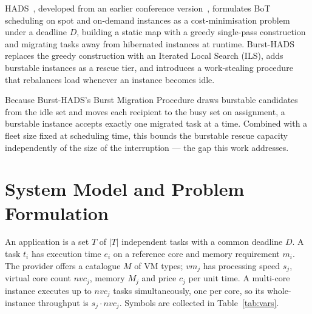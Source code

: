\documentclass[conference]{IEEEtran}
\begin{document}
HADS~\cite{hads2021}, developed from an earlier conference version~\cite{hadsconf},
formulates BoT scheduling on spot and on-demand instances
as a cost-minimisation problem under a deadline $D$, building a static map with
a greedy single-pass construction and migrating tasks away from hibernated
instances at runtime. Burst-HADS~\cite{bursthads} replaces the greedy
construction with an Iterated Local Search (ILS), adds burstable instances as a
rescue tier, and introduces a work-stealing procedure that rebalances load
whenever an instance becomes idle.

Because Burst-HADS's Burst Migration Procedure draws burstable candidates from
the idle set and moves each recipient to the busy set on assignment, a burstable
instance accepts exactly one migrated task at a time. Combined with a fleet size
fixed at scheduling time, this bounds the burstable rescue capacity independently
of the size of the interruption --- the gap this work addresses.

\section{System Model and Problem Formulation}

An application is a set $T$ of $|T|$ independent tasks with a common deadline
$D$. A task $t_i$ has execution time $e_i$ on a reference core and memory
requirement $m_i$. The provider offers a catalogue $M$ of VM types; $vm_j$ has
processing speed $s_j$, virtual core count $\mathit{nvc}_j$, memory $M_j$ and
price $c_j$ per unit time. A multi-core instance executes up to $\mathit{nvc}_j$
tasks simultaneously, one per core, so its whole-instance throughput is
$s_j\cdot \mathit{nvc}_j$. Symbols are collected in Table~\ref{tab:vars}.
\end{document}
